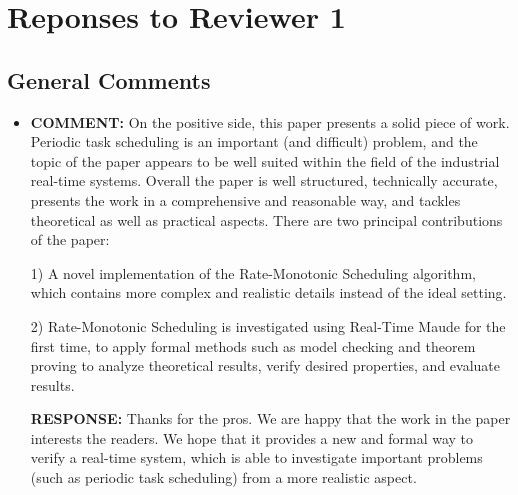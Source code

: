\documentclass[10pt,journal]{IEEEtran}
\newcommand{\hide}[1]{\ignorespaces}
\newcommand{\ANSWER}{{\bf RESPONSE: }}
\newcommand{\COMMENT}{{\bf COMMENT: }}
\begin{document}
\section{Reponses to Reviewer 1}
\subsection{General Comments}
\begin{itemize}

\item
\hide{
The paper shows a realistic implementation of a Rate-Monotonic
Scheduling algorithm using Real-Time Maude (a modeling language based
on rewriting logic) by taking into account the overhead of scheduling
and some other details of the hardware platform. The correctness of
the implementation with respect to the algorithm and the completeness
of the model are verified by model checking, and validated within
different realistic scenarios.}
\COMMENT On the positive side, this paper presents a solid piece of
work. Periodic task scheduling is an important (and difficult)
problem, and the topic of the paper appears to be well suited within
the field of the industrial real-time systems. Overall the paper is
well structured, technically accurate, presents the work in a
comprehensive and reasonable way, and tackles theoretical as well as
practical aspects. There are two principal contributions of the paper:

1) A novel implementation of the Rate-Monotonic Scheduling algorithm,
which contains more complex and realistic details instead of the ideal
setting.

2) Rate-Monotonic Scheduling is investigated using Real-Time Maude for
the first time, to apply formal methods such as model checking and
theorem proving to analyze theoretical results, verify desired
properties, and evaluate results.

\ANSWER Thanks for the pros. We are happy that the work in the paper
interests the readers. We hope that it provides a new and formal way
to verify a real-time system, which is able to investigate important
problems (such as periodic task scheduling) from a more realistic
aspect.


\end{itemize}
\end{document}
